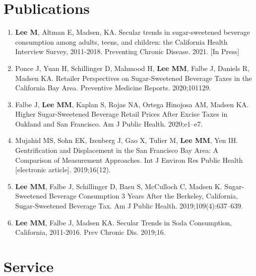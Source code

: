 \documentclass{cv_style}
\begin{document}
\section{Publications}
\begin{enumerate}
    \item \textbf{Lee M}, Altman E, Madsen, KA. Secular trends in sugar-sweetened beverage consumption among adults, teens, and children: the California Health Interview Survey, 2011-2018. Preventing Chronic Disease. 2021. [In Press]
    \item \parskip 1pt Ponce J, Yuan H, Schillinger D, Mahmood H, \textbf{Lee MM}, Falbe J, Daniels R, Madsen KA. Retailer Perspectives on Sugar-Sweetened Beverage Taxes in the California Bay Area. Preventive Medicine Reports. 2020;101129.
    \item \parskip 1pt Falbe J, \textbf{Lee MM}, Kaplan S, Rojas NA, Ortega Hinojosa AM, Madsen KA. Higher Sugar-Sweetened Beverage Retail Prices After Excise Taxes in Oakland and San Francisco. Am J Public Health. 2020;e1–e7. 
    \item \parskip 1pt Mujahid MS, Sohn EK, Izenberg J, Gao X, Tulier M, \textbf{Lee MM}, Yen IH. Gentrification and Displacement in the San Francisco Bay Area: A Comparison of Measurement Approaches. Int J Environ Res Public Health [electronic article]. 2019;16(12).
    \item \parskip 1pt \textbf{Lee MM}, Falbe J, Schillinger D, Basu S, McCulloch C, Madsen K. Sugar-Sweetened Beverage Consumption 3 Years After the Berkeley, California, Sugar-Sweetened Beverage Tax. Am J Public Health. 2019;109(4):637–639. 
    \item \parskip 1pt \textbf{Lee MM}, Falbe J, Madsen KA. Secular Trends in Soda Consumption, California, 2011-2016. Prev Chronic Dis. 2019;16.

\end{enumerate}

\section{Service}
\end{document}
